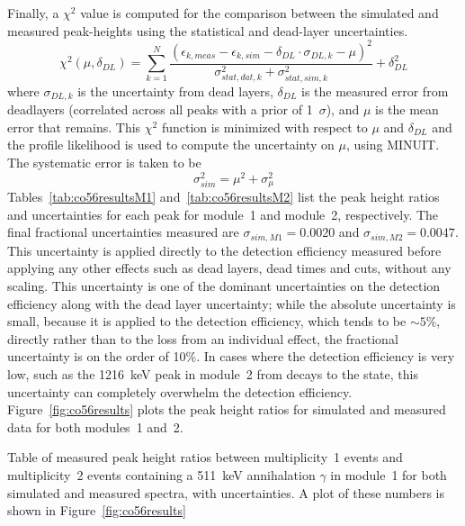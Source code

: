 \documentclass[/main.tex]{subfiles}
\begin{document}
Finally, a $\chi^2$ value is computed for the comparison between the simulated and measured peak-heights using the statistical and dead-layer uncertainties.
\begin{equation}
  \chi^2(\mu, \delta_{DL}) = \displaystyle\sum_{k=1}^N \frac{(\epsilon_{k, meas}-\epsilon_{k, sim}-\delta_{DL}\cdot\sigma_{DL,k} - \mu)^2}{\sigma_{stat,dat,k}^2+\sigma_{stat,sim,k}^2} + \delta_{DL}^2
\end{equation}
where $\sigma_{DL,k}$ is the uncertainty from dead layers, $\delta_{DL}$ is the measured error from deadlayers (correlated across all peaks with a prior of 1~$\sigma$), and $\mu$ is the mean error that remains.
This $\chi^2$ function is minimized with respect to $\mu$ and $\delta_{DL}$ and the profile likelihood is used to compute the uncertainty on $\mu$, using MINUIT\cite{minuit}.
The systematic error is taken to be
\begin{equation}
  \sigma_{sim}^2 = \mu^2 + \sigma_\mu^2
\end{equation}
Tables~\ref{tab:co56resultsM1} and~\ref{tab:co56resultsM2} list the peak height ratios and uncertainties for each peak for module~1 and module~2, respectively.
The final fractional uncertainties measured are $\sigma_{sim,M1}=0.0020$ and $\sigma_{sim,M2}=0.0047$.
This uncertainty is applied directly to the detection efficiency measured before applying any other effects such as dead layers, dead times and cuts, without any scaling.
This uncertainty is one of the dominant uncertainties on the detection efficiency along with the dead layer uncertainty; while the absolute uncertainty is small, because it is applied to the detection efficiency, which tends to be ${\sim}5$\%, directly rather than to the loss from an individual effect, the fractional uncertainty is on the order of 10\%.
In cases where the detection efficiency is very low, such as the 1216~keV peak in module~2 from decays to the  state, this uncertainty can completely overwhelm the detection efficiency.
Figure~\ref{fig:co56results} plots the peak height ratios for simulated and measured data for both modules~1 and~2.

\begin{table}[p]
  \caption[Table of peak height ratios for module~1]{\label{tab:co56resultsM1}
    Table of measured peak height ratios between multiplicity~1 events and multiplicity~2 events containing a 511~keV annihalation $\gamma$ in module~1 for both simulated and measured  spectra, with uncertainties. A plot of these numbers is shown in Figure~\ref{fig:co56results}
  }
  
\end{table}
\end{document}

